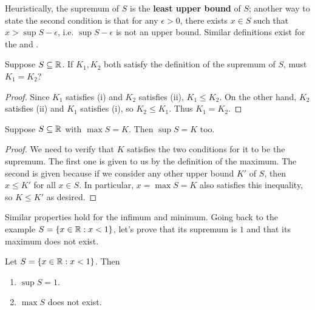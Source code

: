 \documentclass[main.tex]{subfiles}
\begin{document}
Heuristically, the supremum of $S$ is the \textbf{least upper bound} of $S$; another way to state the second condition is that for any $\epsilon > 0$, there exists $x\in S$ such that $x > \sup S - \epsilon$, i.e. $\sup S - \epsilon$ is not an upper bound. Similar definitions exist for the  and .

\begin{proposition}
    Suppose $S\subseteq \mathbb R$. If $K_1, K_2$ both satisfy the definition of the supremum of $S$, must $K_1 = K_2$?
\end{proposition}

\begin{proof}
    Since $K_1$ satisfies (i) and $K_2$ satisfies (ii), $K_1\le K_2$. On the other hand, $K_2$ satisfies (ii) and $K_1$ satisfies (i), so $K_2\le K_1$. Thus $K_1 = K_2$.
\end{proof}

\begin{proposition}
    Suppose $S\subseteq \mathbb R$ with $\max S = K$. Then $\sup S = K$ too.
\end{proposition}

\begin{proof}
    We need to verify that $K$ satisfies the two conditions for it to be the supremum. The first one is given to us by the definition of the maximum. The second is given because if we consider any other upper bound $K'$ of $S$, then $x\le K'$ for all $x\in S$. In particular, $x = \max S = K$ also satisfies this inequality, so $K \le K'$ as desired.
\end{proof}

Similar properties hold for the infimum and minimum. Going back to the example $S = \{x \in \mathbb R : x < 1\}$, let's prove that its supremum is $1$ and that its maximum does not exist.

\begin{example}
    Let $S = \{x\in \mathbb R : x < 1\}$. Then
    \begin{enumerate}
        \item $\sup S = 1$.
        \item $\max S$ does not exist.
    \end{enumerate}
\end{example}
\end{document}
